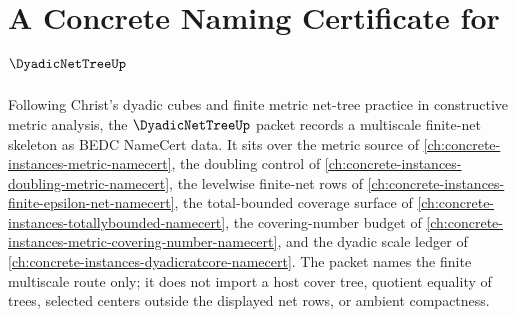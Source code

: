 \chapter{A Concrete Naming Certificate for $\DyadicNetTreeUp$}
\label{ch:concrete-instances-dyadic-net-tree-namecert}

Following Christ's dyadic cubes and finite metric net-tree practice in constructive metric analysis, the $\DyadicNetTreeUp$ packet records a multiscale finite-net skeleton as BEDC NameCert data. It sits over the metric source of \autoref{ch:concrete-instances-metric-namecert}, the doubling control of \autoref{ch:concrete-instances-doubling-metric-namecert}, the levelwise finite-net rows of \autoref{ch:concrete-instances-finite-epsilon-net-namecert}, the total-bounded coverage surface of \autoref{ch:concrete-instances-totallybounded-namecert}, the covering-number budget of \autoref{ch:concrete-instances-metric-covering-number-namecert}, and the dyadic scale ledger of \autoref{ch:concrete-instances-dyadicratcore-namecert}. The packet names the finite multiscale route only; it does not import a host cover tree, quotient equality of trees, selected centers outside the displayed net rows, or ambient compactness.

